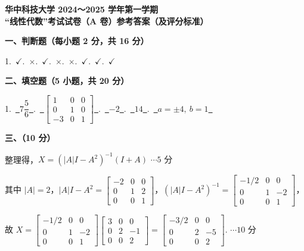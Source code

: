 \documentclass[a4paper,11pt]{ctexart}
\newcommand{\score}[1]{\hfill$\cdots\text{#1 分}$}
\begin{document}
\begin{center}
  {\Large\bfseries 华中科技大学 2024～2025 学年第一学期}\\[0.4em]
  {\Large\bfseries “线性代数”考试试卷（A 卷）参考答案（及评分标准）}
\end{center}

\vspace{0.8em}

\textbf{一、判断题（每小题 2 分，共 16 分）}

\vspace{0.4em}
1.\ $\checkmark$.\ $\times$.\ $\checkmark$.\ $\times$.\ $\times$.\ $\checkmark$.\ $\checkmark$.\ $\checkmark$

\vspace{1.0em}

\textbf{二、填空题（5 小题，共 20 分）}

\vspace{0.4em}
1.\ \underline{\ $7\dfrac{5}{6}$\ }.\ \underline{\ $\begin{bmatrix} 1 & 0 & 0 \\ 0 & 1 & 0 \\ -3 & 0 & 1 \end{bmatrix}$\ }.\ \underline{\ $-2$\ }.\ \underline{\ $14$\ }.\ \underline{\ $a = \pm 4,\ b = 1$\ }

\vspace{1.0em}

\textbf{三、（10 分）}

\vspace{0.3em}
整理得，$X = (|A|I - A^2)^{-1}(I + A)$ \score{5}

\vspace{0.3em}
其中 $|A| = 2$，$|A|I - A^2 = \begin{bmatrix} -2 & 0 & 0 \\ 0 & 1 & 2 \\ 0 & 0 & 1 \end{bmatrix}$，$(|A|I - A^2)^{-1} = \begin{bmatrix} -1/2 & 0 & 0 \\ 0 & 1 & -2 \\ 0 & 0 & 1 \end{bmatrix}$，

\vspace{0.3em}
故 $X = \begin{bmatrix} -1/2 & 0 & 0 \\ 0 & 1 & -2 \\ 0 & 0 & 1 \end{bmatrix}\begin{bmatrix} 3 & 0 & 0 \\ 0 & 2 & -1 \\ 0 & 0 & 2 \end{bmatrix} = \begin{bmatrix} -3/2 & 0 & 0 \\ 0 & 2 & -5 \\ 0 & 0 & 2 \end{bmatrix}$. \score{10}
\end{document}
